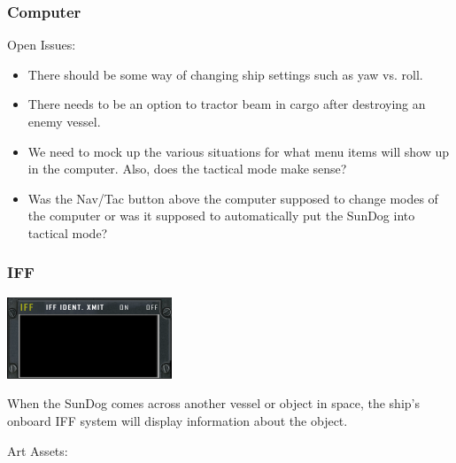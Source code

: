 \subsubsection{Computer}

Open Issues:
\begin{itemize}
\item There should be some way of changing ship settings such as yaw vs.
roll.
\item There needs to be an option to tractor beam in cargo after
destroying an enemy vessel.
\item We need to mock up the various situations for what menu items
will show up in the computer.  Also, does the tactical mode make sense?
\item Was the Nav\slash Tac button above the computer supposed to change modes
of the computer or was it supposed to automatically put the SunDog into
tactical mode?
\end{itemize}

\subsubsection{IFF}

\includegraphics[scale=0.70]{images/iff.png}

When the SunDog comes across another vessel or object in space, the ship's
onboard IFF system will display information about the object.  

Art Assets:

